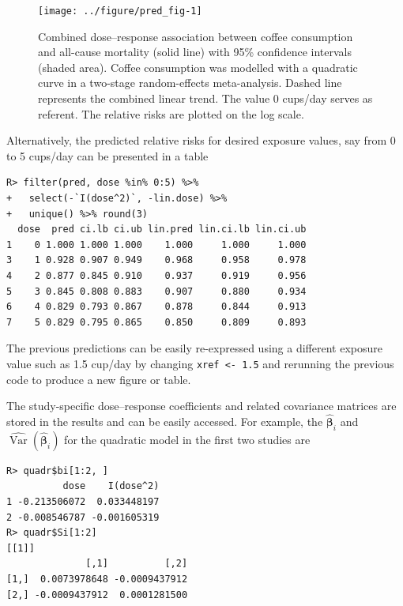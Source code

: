 \documentclass[11pt,a4paper,twoside,openany]{book}\usepackage{knitr}
\DeclareMathOperator{\Var}{Var}
\begin{document}
{\begin{knitrout}
\begin{figure}[ht!]
{\centering \texttt{[image: ../figure/pred\_fig-1]} 

}

\caption[Combined dose--response association between coffee consumption and all-cause mortality (solid line) with 95\% confidence intervals (shaded area)]{Combined dose--response association between coffee consumption and all-cause mortality (solid line) with 95\% confidence intervals (shaded area). Coffee consumption was modelled with a quadratic curve in a two-stage random-effects meta-analysis. Dashed line represents the combined linear trend. The value 0 cups/day serves as referent. The relative risks are plotted on the log scale.}\label{fig:pred_fig}
\end{figure}


\end{knitrout}

\noindent Alternatively, the predicted relative risks for desired exposure values, say from 0 to 5 cups/day can be presented in a table

\begin{knitrout}\footnotesize
{}\color{fgcolor}\begin{kframe}
\begin{verbatim}
R> filter(pred, dose %in% 0:5) %>%
+   select(-`I(dose^2)`, -lin.dose) %>% 
+   unique() %>% round(3)
  dose  pred ci.lb ci.ub lin.pred lin.ci.lb lin.ci.ub
1    0 1.000 1.000 1.000    1.000     1.000     1.000
3    1 0.928 0.907 0.949    0.968     0.958     0.978
4    2 0.877 0.845 0.910    0.937     0.919     0.956
5    3 0.845 0.808 0.883    0.907     0.880     0.934
6    4 0.829 0.793 0.867    0.878     0.844     0.913
7    5 0.829 0.795 0.865    0.850     0.809     0.893
\end{verbatim}
\end{kframe}
\end{knitrout}

\noindent The previous predictions can be easily re-expressed using a different exposure value such as 1.5 cup/day by changing \texttt{xref <- 1.5} and rerunning the previous code to produce a new figure or table.

The study-specific dose--response coefficients and related covariance matrices are stored in the results and can be easily accessed. For example, the $\boldsymbol{\hat \beta}_i$ and $\widehat{\Var} \left( \boldsymbol{\hat \beta}_i \right)$ for the quadratic model in the first two studies are

\begin{knitrout}\footnotesize
{}\color{fgcolor}\begin{kframe}
\begin{verbatim}
R> quadr$bi[1:2, ]
          dose    I(dose^2)
1 -0.213506072  0.033448197
2 -0.008546787 -0.001605319
R> quadr$Si[1:2]
[[1]]
              [,1]          [,2]
[1,]  0.0073978648 -0.0009437912
[2,] -0.0009437912  0.0001281500


\end{verbatim}
\end{kframe}
\end{knitrout}}
\end{document}
